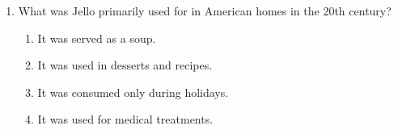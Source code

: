 \documentclass[12pt]{article}
\begin{document}
\begin{enumerate}
\vspace{0.5cm}

\item What was Jello primarily used for in American homes in the 20th century?
\begin{enumerate}[label=\Alph*.]
    \item It was served as a soup.
    \item It was used in desserts and recipes.
    \item It was consumed only during holidays.
    \item It was used for medical treatments.
\end{enumerate}

\end{enumerate}
\end{document}

